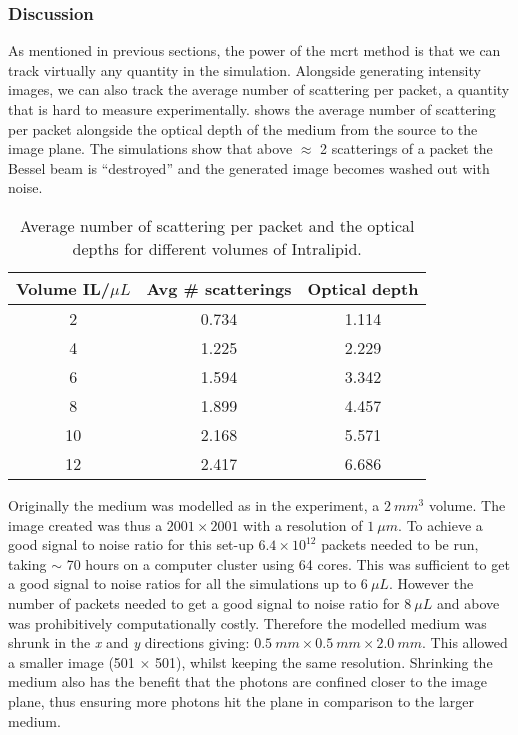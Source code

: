 \subsubsection*{Discussion}

As mentioned in previous sections, the power of the \gls*{mcrt} method is that we can track virtually any quantity in the simulation.
Alongside generating intensity images, we can also track the average number of scattering per packet, a quantity that is hard to measure experimentally.
 shows the average number of scattering per packet alongside the optical depth of the medium from the source to the image plane.
The simulations show that above $\approx$ 2 scatterings of a packet the Bessel beam is ``destroyed'' and the generated image becomes washed out with noise.

\begin{table}[!ht]
    \centering
    \begin{tabular}{c|c|c}
    Volume IL/$\mu L$ & Avg \# scatterings & Optical depth \\ \hline
    2      & 0.734              & 1.114         \\
    4      & 1.225              & 2.229         \\
    6      & 1.594              & 3.342         \\
    8      & 1.899              & 4.457         \\
    10     & 2.168              & 5.571         \\
    12     & 2.417              & 6.686        
    \end{tabular}
    \caption{Average number of scattering per packet and the optical depths for different volumes of Intralipid.}
    \label{tab:numscatt}
\end{table}

Originally the medium was modelled as in the experiment, a $2~mm^3$ volume.
The image created was thus a $2001 \times 2001$ with a resolution of $1~\mu m$.
To achieve a good signal to noise ratio for this set-up $6.4\times10^{12}$ packets needed to be run, taking $\sim$ 70 hours on a computer cluster using 64 cores.
This was sufficient to get a good signal to noise ratios for all the simulations up to $6~\mu L$.
However the number of packets needed to get a good signal to noise ratio for $8~\mu L$ and above was prohibitively computationally costly.
Therefore the modelled medium was shrunk in the \textit{x} and \textit{y} directions giving: $0.5~mm \times 0.5~mm \times 2.0~mm$.
This allowed a smaller image (501 $\times$ 501), whilst keeping the same resolution.
Shrinking the medium also has the benefit that the photons are confined closer to the image plane, thus ensuring more photons hit the plane in comparison to the larger medium. 

